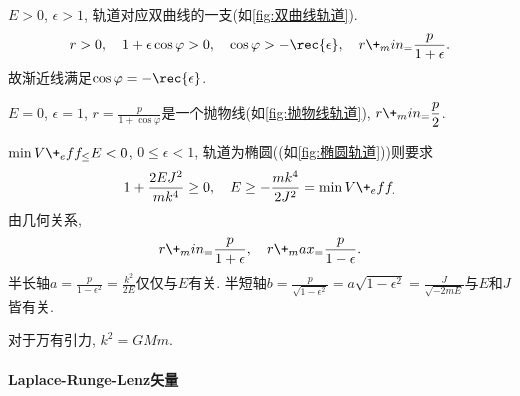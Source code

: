 \documentclass[../LectureNotes.tex]{subfiles}
\begin{document}
\begin{cenum}
    \item $E>0$, $\epsilon>1$, 轨道对应双曲线的一支(如\cref{fig:双曲线轨道}).
    \[ r>0,\quad 1+\epsilon\cos\varphi > 0,\quad \cos\varphi > -\rec{\epsilon},\quad r\+_min_ = \frac{p}{1+\epsilon}. \]
    故渐近线满足$\displaystyle \cos\varphi = -\rec{\epsilon}$.
    \item $E=0$, $\epsilon = 1$, $\displaystyle r = \frac{p}{1+\cos\varphi}$是一个抛物线(如\cref{fig:抛物线轨道}), $\displaystyle r\+_min_ = \frac{p}{2}$.
    \item $\min V\+_eff_ \le E<0$, $0\le \epsilon <1$, 轨道为椭圆((如\cref{fig:椭圆轨道}))则要求
    \[ 1+\frac{2EJ^2}{mk^4} \ge 0,\quad E\ge -\frac{mk^4}{2J^2} = \min V\+_eff_. \]
    由几何关系,
    \[ r\+_min_ = \frac{p}{1+\epsilon},\quad r\+_max_ = \frac{p}{1-\epsilon}. \]
    半长轴$a = \displaystyle \frac{p}{1-\epsilon^2} = \frac{k^2}{2E}$仅仅与$E$有关. 半短轴$\displaystyle b = \frac{p}{\sqrt{1-\epsilon^2}} = a\sqrt{1-\epsilon^2} = \frac{J}{\sqrt{-2mE}}$与$E$和$J$皆有关.
\end{cenum}
对于万有引力, $k^2 = GMm$.

\paragraph{Laplace-Runge-Lenz矢量} %
\label{par:laplace_runge_lenz矢量}
\end{document}
